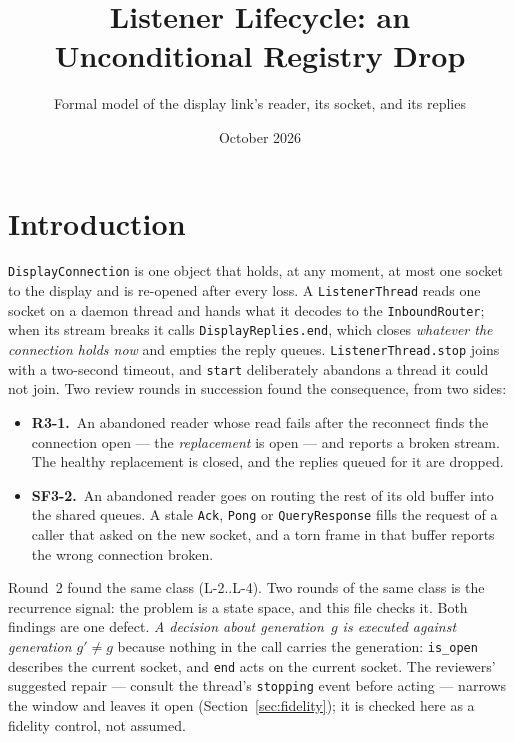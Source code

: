 \documentclass[a4paper,10pt,fleqn]{article}
\begin{document}
\title{Listener Lifecycle: an Unconditional Registry Drop}
\author{Formal model of the display link's reader, its socket, and its replies}
\date{October 2026}
\maketitle

\section{Introduction}

\texttt{DisplayConnection} is one object that holds, at any moment, at most
one socket to the display and is re-opened after every loss.  A
\texttt{ListenerThread} reads one socket on a daemon thread and hands what it
decodes to the \texttt{InboundRouter}; when its stream breaks it calls
\texttt{DisplayReplies.end}, which closes \emph{whatever the connection holds
now} and empties the reply queues.  \texttt{ListenerThread.stop} joins with a
two-second timeout, and \texttt{start} deliberately abandons a thread it could
not join.  Two review rounds in succession found the consequence, from two
sides:

\begin{itemize}
  \item \textbf{R3-1.}\ An abandoned reader whose read fails after the
    reconnect finds the connection open --- the \emph{replacement} is open ---
    and reports a broken stream.  The healthy replacement is closed, and the
    replies queued for it are dropped.
  \item \textbf{SF3-2.}\ An abandoned reader goes on routing the rest of its
    old buffer into the shared queues.  A stale \texttt{Ack},
    \texttt{Pong} or \texttt{QueryResponse} fills the request of a caller that
    asked on the new socket, and a torn frame in that buffer reports the wrong
    connection broken.
\end{itemize}

Round~2 found the same class (L-2..L-4).  Two rounds of the same class is the
recurrence signal: the problem is a state space, and this file checks it.
Both findings are one defect.  \emph{A decision about generation~$g$ is
executed against generation $g' \ne g$} because nothing in the call carries
the generation: \texttt{is\_open} describes the current socket, and
\texttt{end} acts on the current socket.  The reviewers' suggested repair ---
consult the thread's \texttt{stopping} event before acting --- narrows the
window and leaves it open (Section~\ref{sec:fidelity}); it is checked here as
a fidelity control, not assumed.
\end{document}
